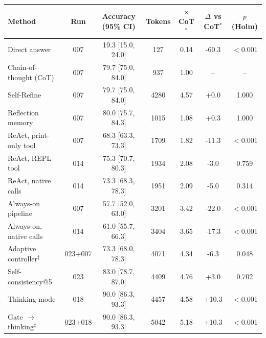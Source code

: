 \begin{tabular}{lcccccc}
\toprule
Method & Run & Accuracy (95\% CI) & Tokens & $\times$CoT$^\ast$ & $\Delta$ vs CoT$^\ast$ & $p$ (Holm) \\
\midrule
Direct answer & 007 & 19.3 [15.0, 24.0] & 127 & 0.14 & -60.3 & $<$0.001 \\
Chain-of-thought (CoT) & 007 & 79.7 [75.0, 84.0] & 937 & 1.00 & -- & -- \\
Self-Refine & 007 & 79.7 [75.0, 84.0] & 4280 & 4.57 & +0.0 & 1.000 \\
Reflection memory & 007 & 80.0 [75.7, 84.3] & 1015 & 1.08 & +0.3 & 1.000 \\
ReAct, print-only tool & 007 & 68.3 [63.3, 73.3] & 1709 & 1.82 & -11.3 & $<$0.001 \\
ReAct, REPL tool & 014 & 75.3 [70.7, 80.3] & 1934 & 2.08 & -3.0 & 0.759 \\
ReAct, native calls & 014 & 73.3 [68.3, 78.3] & 1951 & 2.09 & -5.0 & 0.314 \\
Always-on pipeline & 007 & 57.7 [52.0, 63.0] & 3201 & 3.42 & -22.0 & $<$0.001 \\
Always-on, native calls & 014 & 61.0 [55.7, 66.3] & 3404 & 3.65 & -17.3 & $<$0.001 \\
Adaptive controller$^\ddagger$ & 023+007 & 73.3 [68.0, 78.3] & 4071 & 4.34 & -6.3 & 0.048 \\
Self-consistency@5 & 023 & 83.0 [78.7, 87.0] & 4409 & 4.76 & +3.0 & 0.702 \\
Thinking mode & 018 & 90.0 [86.3, 93.3] & 4457 & 4.58 & +10.3 & $<$0.001 \\
Gate $\rightarrow$ thinking$^\ddagger$ & 023+018 & 90.0 [86.3, 93.3] & 5042 & 5.18 & +10.3 & $<$0.001 \\
\bottomrule
\end{tabular}
